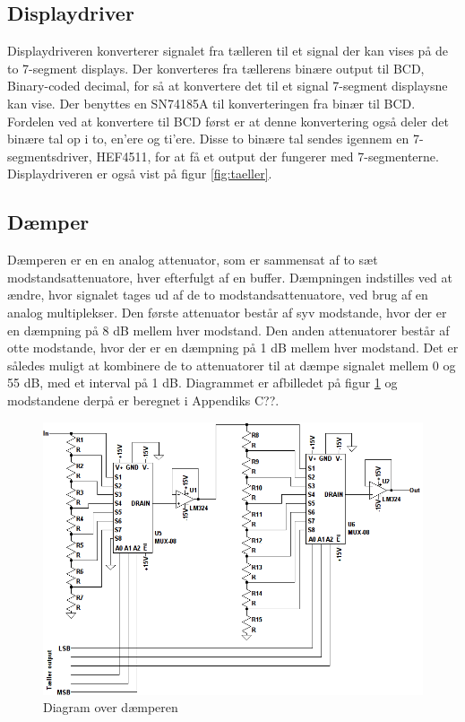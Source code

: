 \subsection*{Displaydriver}
\label{volumenkontrol-design-display_driver}
Displaydriveren konverterer signalet fra tælleren til et signal der kan vises på de to 7-segment displays. Der konverteres fra tællerens binære output til BCD, Binary-coded decimal, for så at konvertere det til et signal 7-segment displaysne kan vise. Der benyttes en SN74185A til konverteringen fra binær til BCD. Fordelen ved at konvertere til BCD først er at denne konvertering også deler det binære tal op i to, en'ere og ti'ere. Disse to binære tal sendes igennem en 7-segmentsdriver, HEF4511, for at få et output der fungerer med 7-segmenterne. Displaydriveren er også vist på figur \ref{fig:taeller}.

\subsection*{Dæmper}
\label{volumenkontrol-design-daemper}
Dæmperen er en en analog attenuator, som er sammensat af to sæt modstandsattenuatore, hver efterfulgt af en buffer. Dæmpningen indstilles ved at ændre, hvor signalet tages ud af de to modstandsattenuatore, ved brug af en analog multiplekser. Den første attenuator består af syv modstande, hvor der er en dæmpning på 8 dB mellem hver modstand. Den anden attenuatorer består af otte modstande, hvor der er en dæmpning på 1 dB mellem hver modstand. Det er således muligt at kombinere de to attenuatorer til at dæmpe signalet mellem 0 og 55 dB, med et interval på 1 dB. Diagrammet er afbilledet på figur \ref{fig:volumenkontrol_daemper} og modstandene derpå er beregnet i Appendiks C??.

\begin{figure}[h]
\centering
\includegraphics[width=\textwidth]{teknisk/volumenkontrol/daemper.png}
\caption{Diagram over dæmperen}
\label{fig:volumenkontrol_daemper}
\end{figure}

